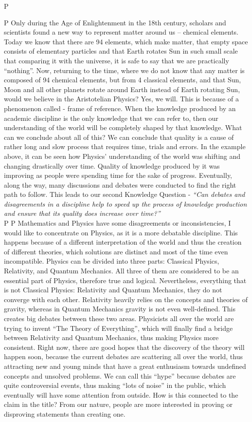 P \documentclass[12pt,a4paper]{article}
\begin{document}
P Only during the Age of Enlightenment in the 18th century, scholars and scientists found a new way to represent matter around us – chemical elements. Today we know that there are 94 elements\cite{table}, which make matter, that empty space consists of elementary particles and that Earth rotates Sun in such small scale that comparing it with the universe, it is safe to say that we are practically ``nothing''. Now, returning to the time, where we do not know that any matter is composed of 94 chemical elements, but from 4 classical elements, and that Sun, Moon and all other planets rotate around Earth instead of Earth rotating Sun, would we believe in the Aristotelian Physics? Yes, we will. This is because of a phenomenon called - frame of reference. When the knowledge produced by an academic discipline is the only knowledge that we can refer to, then our understanding of the world will be completely shaped by that knowledge. What can we conclude about all of this? We can conclude that quality is a cause of rather long and slow process that requires time, trials and errors. In the example above, it can be seen how Physics’ understanding of the world was shifting and changing drastically over time. Quality of knowledge produced by it was improving as people were spending time for the sake of progress. Eventually, along the way, many discussions and debates were conducted to find the right path to follow. This leads to our second Knowledge Question - \textit{``Can debates and disagreements in a discipline help to speed up the process of knowledge production and ensure that its quality does increase over time?''}\\
P 
P Mathematics and Physics have some disagreements or inconsistencies, I would like to concentrate on Physics, as it is a more debatable discipline. This happens because of a different interpretation of the world and thus the creation of different theories, which solutions are distinct and most of the time even incompatible. Physics can be divided into three parts: Classical Physics, Relativity, and Quantum Mechanics\cite{bop}. All three of them are considered to be an essential part of Physics, therefore true and logical. Nevertheless, everything that is not Classical Physics: Relativity and Quantum Mechanics, they do not converge with each other. Relativity heavily relies on the concepts and theories of gravity, whereas in Quantum Mechanics gravity is not even well-defined. This creates big debates between these two areas. Physicists all over the world are trying to invent “The Theory of Everything”\cite{toe}, which will finally find a bridge between Relativity and Quantum Mechanics, thus making Physics more consistent. Right now, there are good hopes that the discovery of the theory will happen soon, because the current debates are scattering all over the world, thus attracting new and young minds that have a great enthusiasm towards undefined concepts and unsolved problems. We can call this ``hype'' because debates are quite controversial events, thus making “lots of noise” in the public, which eventually will have some attention from outside. How is this connected to the claim in the title? From our nature, people are more interested in proving or disproving statements than creating one. \\
\end{document}
